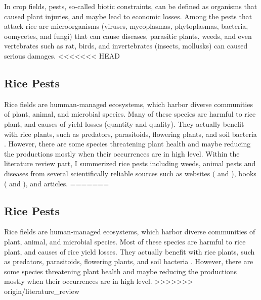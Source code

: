 \documentclass[12pt, oneside]{report}
\begin{document}
In crop fields, pests, so-called biotic constraints, can be defined as organisms that caused plant injuries, and maybe lead to economic losses. Among the pests that attack rice are microorganisms (viruses, mycoplasmas, phytoplasmas, bacteria, oomycetes, and fungi) that can cause diseases, parasitic plants, weeds, and even vertebrates such as rat, birds, and invertebrates (insects, mollusks) can caused serious damages. %
<<<<<<< HEAD
\subsection*{Rice Pests}

Rice fields are humman-managed ecosystems, which harbor diverse communities of plant, animal, and microbial species. Many of these species are harmful to rice plant, and causes of yield losses (quantity and quality). They actually benefit with rice plants, such as predators, parasitoids, flowering plants, and soil bacteria \citep{norton2010rice}. However, there are some species threatening plant health and maybe reducing the productions mostly when their occurrences are in high level. Within the literature review part, I summerized rice pests including weeds, animal pests and diseases from several scientifically reliable sources such as websites (\citet{irrirkb} and ), books (\citet{ouricedisease} and \citet{mew2002handbook}), and articles.
=======


\newpage

\subsection*{Rice Pests}

Rice fields are human-managed ecosystems, which harbor diverse communities of plant, animal, and microbial species. Most of these species are harmful to rice plant, and causes of rice yield losses. They actually benefit with rice plants, such as predators, parasitoids, flowering plants, and soil bacteria \citep{norton2010rice}. However, there are some species threatening plant health and maybe reducing the productions mostly when their occurrences are in high level. 
>>>>>>> origin/literature_review
\end{document}
